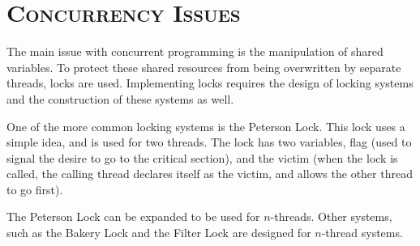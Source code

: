 \documentclass[FinalReport.tex]{subfiles}
\begin{document}
\bigskip

\section*{\textsc{\Large Concurrency Issues}}

	The main issue with concurrent programming is the manipulation of shared variables.  To protect these shared resources from being overwritten by separate threads, locks are used.  Implementing locks requires the design of locking systems and the construction of these systems as well.  
	
	One of the more common locking systems is the Peterson Lock.  This lock uses a simple idea, and is used for two threads.  The lock has two variables, flag (used to signal the desire to go to the critical section), and the victim (when the lock is called, the calling thread declares itself as the victim, and allows the other thread to go first).  
	
	The Peterson Lock can be expanded to be used for $n$-threads.  Other systems, such as the Bakery Lock and the Filter Lock are designed for $n$-thread systems.  
\end{document}
